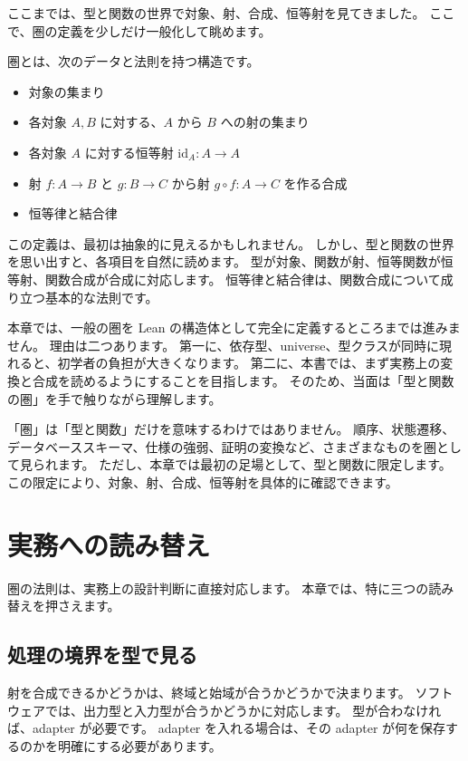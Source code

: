 ここまでは、型と関数の世界で対象、射、合成、恒等射を見てきました。
ここで、圏の定義を少しだけ一般化して眺めます。

圏とは、次のデータと法則を持つ構造です。
\begin{itemize}
\item 対象の集まり
\item 各対象 \(A, B\) に対する、\(A\) から \(B\) への射の集まり
\item 各対象 \(A\) に対する恒等射 \(\mathrm{id}_A : A \to A\)
\item 射 \(f : A \to B\) と \(g : B \to C\) から射 \(g \circ f : A \to C\) を作る合成
\item 恒等律と結合律
\end{itemize}

この定義は、最初は抽象的に見えるかもしれません。
しかし、型と関数の世界を思い出すと、各項目を自然に読めます。
型が対象、関数が射、恒等関数が恒等射、関数合成が合成に対応します。
恒等律と結合律は、関数合成について成り立つ基本的な法則です。

本章では、一般の圏を Lean の構造体として完全に定義するところまでは進みません。
理由は二つあります。
第一に、依存型、universe、型クラスが同時に現れると、初学者の負担が大きくなります。
第二に、本書では、まず実務上の変換と合成を読めるようにすることを目指します。
そのため、当面は「型と関数の圏」を手で触りながら理解します。

「圏」は「型と関数」だけを意味するわけではありません。
順序、状態遷移、データベーススキーマ、仕様の強弱、証明の変換など、さまざまなものを圏として見られます。
ただし、本章では最初の足場として、型と関数に限定します。
この限定により、対象、射、合成、恒等射を具体的に確認できます。

\section{実務への読み替え}

圏の法則は、実務上の設計判断に直接対応します。
本章では、特に三つの読み替えを押さえます。

\subsection{処理の境界を型で見る}

射を合成できるかどうかは、終域と始域が合うかどうかで決まります。
ソフトウェアでは、出力型と入力型が合うかどうかに対応します。
型が合わなければ、adapter が必要です。
adapter を入れる場合は、その adapter が何を保存するのかを明確にする必要があります。

